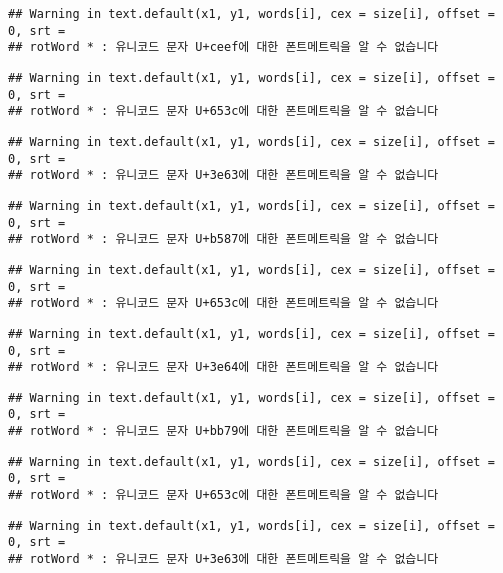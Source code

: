 \documentclass[]{article}
\begin{document}
\begin{verbatim}
## Warning in text.default(x1, y1, words[i], cex = size[i], offset = 0, srt =
## rotWord * : 유니코드 문자 U+ceef에 대한 폰트메트릭을 알 수 없습니다
\end{verbatim}

\begin{verbatim}
## Warning in text.default(x1, y1, words[i], cex = size[i], offset = 0, srt =
## rotWord * : 유니코드 문자 U+653c에 대한 폰트메트릭을 알 수 없습니다
\end{verbatim}

\begin{verbatim}
## Warning in text.default(x1, y1, words[i], cex = size[i], offset = 0, srt =
## rotWord * : 유니코드 문자 U+3e63에 대한 폰트메트릭을 알 수 없습니다
\end{verbatim}

\begin{verbatim}
## Warning in text.default(x1, y1, words[i], cex = size[i], offset = 0, srt =
## rotWord * : 유니코드 문자 U+b587에 대한 폰트메트릭을 알 수 없습니다
\end{verbatim}

\begin{verbatim}
## Warning in text.default(x1, y1, words[i], cex = size[i], offset = 0, srt =
## rotWord * : 유니코드 문자 U+653c에 대한 폰트메트릭을 알 수 없습니다
\end{verbatim}

\begin{verbatim}
## Warning in text.default(x1, y1, words[i], cex = size[i], offset = 0, srt =
## rotWord * : 유니코드 문자 U+3e64에 대한 폰트메트릭을 알 수 없습니다
\end{verbatim}

\begin{verbatim}
## Warning in text.default(x1, y1, words[i], cex = size[i], offset = 0, srt =
## rotWord * : 유니코드 문자 U+bb79에 대한 폰트메트릭을 알 수 없습니다
\end{verbatim}

\begin{verbatim}
## Warning in text.default(x1, y1, words[i], cex = size[i], offset = 0, srt =
## rotWord * : 유니코드 문자 U+653c에 대한 폰트메트릭을 알 수 없습니다
\end{verbatim}

\begin{verbatim}
## Warning in text.default(x1, y1, words[i], cex = size[i], offset = 0, srt =
## rotWord * : 유니코드 문자 U+3e63에 대한 폰트메트릭을 알 수 없습니다
\end{verbatim}
\end{document}
